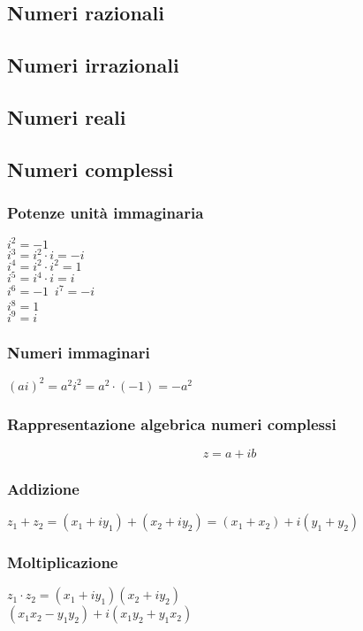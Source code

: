 \documentclass[a4paper,12pt]{article}
\theoremstyle{mystyle}
\begin{document}
\subsection{Numeri razionali}
\subsection{Numeri irrazionali}
\subsection{Numeri reali}

\subsection{Numeri complessi}


\subsubsection{Potenze unità immaginaria}
\(i^2=-1 \)\\
\(i^3=i^2 \cdot i = -i \)\\
\(i^4 = i^2 \cdot i^2 = 1 \)\\
\(i^5 = i^4 \cdot i = i \)\\
\(i^6 = -1 \)\
\(i^7 = -i \)\\
\(i^8 = 1 \)\\
\(i^9=i \)

\subsubsection{Numeri immaginari}
\((ai)^2 = a^2i^2 = a^2 \cdot (-1) = - a^2\)

\subsubsection{Rappresentazione algebrica numeri complessi}
\[z = a + ib\]

\subsubsection{Addizione}
\(z_1+z_2=(x_1+iy_1)+(x_2+iy_2) =(x_1+x_2)+i(y_1+y_2)\)

\subsubsection{Moltiplicazione}
\(z_1 \cdot z_2 = (x_1+iy_1)(x_2+iy_2) \)\\
\((x_1x_2-y_1y_2)+i(x_1y_2 + y_1x_2) \)
\end{document}
